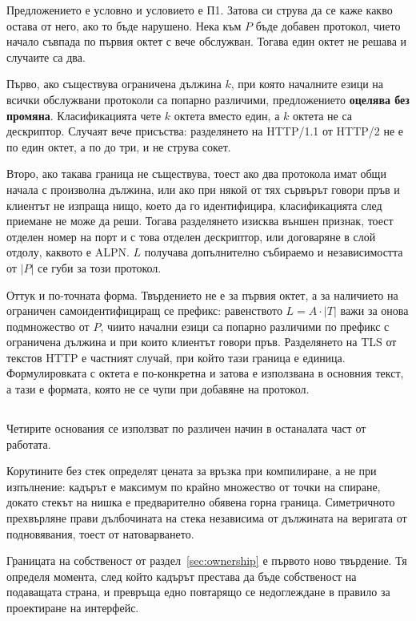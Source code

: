 Предложението е условно и условието е П1. Затова си струва да се каже какво остава от него,
ако то бъде нарушено. Нека към \(P\) бъде добавен протокол, чието начало съвпада по първия
октет с вече обслужван. Тогава един октет не решава и случаите са два.

Първо, ако съществува ограничена дължина \(k\), при която началните езици на всички
обслужвани протоколи са попарно различими, предложението \textbf{оцелява без промяна}.
Класификацията чете \(k\) октета вместо един, а \(k\) октета не са дескриптор. Случаят вече
присъства: разделянето на HTTP/1.1 от HTTP/2 не е по един октет, а по до три, и не струва
сокет.

Второ, ако такава граница не съществува, тоест ако два протокола имат общи начала с произволна
дължина, или ако при някой от тях сървърът говори пръв и клиентът не изпраща нищо, което да го
идентифицира, класификацията след приемане не може да реши. Тогава разделянето изисква външен
признак, тоест отделен номер на порт и с това отделен дескриптор, или договаряне в слой
отдолу, каквото е ALPN. \(L\) получава допълнително събираемо и независимостта от \(|P|\) се
губи за този протокол.

Оттук и по-точната форма. Твърдението не е за първия октет, а за наличието на ограничен
самоидентифициращ се префикс: равенството \(L = A \cdot |T|\) важи за онова подмножество от
\(P\), чиито начални езици са попарно различими по префикс с ограничена дължина и при които
клиентът говори пръв. Разделянето на TLS от текстов HTTP е частният случай, при който тази
граница е единица. Формулировката с октета е по-конкретна и затова е използвана в основния
текст, а тази е формата, която не се чупи при добавяне на протокол.

\subsection{}

Четирите основания се използват по различен начин в останалата част от работата.

Корутините без стек определят цената за връзка при компилиране, а не при изпълнение: кадърът
е максимум по крайно множество от точки на спиране, докато стекът на нишка е предварително
обявена горна граница. Симетричното прехвърляне прави дълбочината на стека независима от
дължината на веригата от подновявания, тоест от натоварването.

Границата на собственост от раздел~\ref{sec:ownership} е първото ново твърдение. Тя определя
момента, след който кадърът престава да бъде собственост на подаващата страна, и превръща
едно повтарящо се недоглеждане в правило за проектиране на интерфейс.

